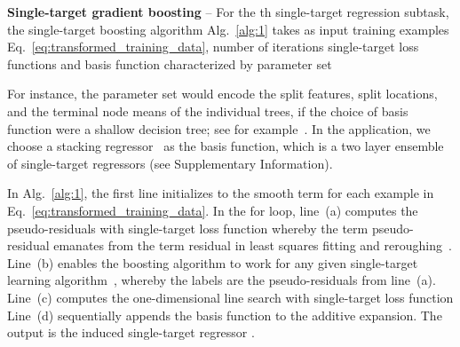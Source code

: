 \documentclass[aps,twocolumn,superscriptaddress,floatfix,preprintnumbers,showkeys]{revtex4}
\begin{document}
\textbf{Single-target gradient boosting} -- For the th single-target regression subtask, the single-target boosting algorithm Alg.~\ref{alg:1} takes as input training examples Eq.~\ref{eq:transformed_training_data}, number of iterations  single-target loss functions  and basis function  characterized by parameter set  
\begin{figure*}
\begin{minipage}{\linewidth}
\begin{algorithm}[H]
\SetAlgoLined
{}
\caption{}
\label{alg:1}
\end{algorithm}
\end{minipage}
\end{figure*}
For instance, the parameter set would encode the split features, split locations, and the terminal node means of the individual trees, if the choice of basis function were a shallow decision tree; see for example~\cite{Friedman_2001, Friedman_2003, Hastie_2009, Chen_2016, Ke_2017}. In the application, we choose a stacking regressor~\cite{Wolpert_1992, Breiman_1996, Sklearn_2011} as the basis function, which is a two layer ensemble of single-target regressors (see Supplementary Information). 

In Alg.~\ref{alg:1}, the first line initializes to the smooth term for each example in Eq.~\ref{eq:transformed_training_data}. In the for loop, line~(a) computes the pseudo-residuals with single-target loss function  whereby the term pseudo-residual emanates from the term residual in least squares fitting and reroughing~\cite{Tukey_1977, Friedman_2001, Friedman_2003, Hastie_2009}. Line~(b) enables the boosting algorithm to work for any given single-target learning algorithm~\cite{Friedman_2001, Friedman_2003, Hastie_2009}, whereby the labels are the pseudo-residuals from line~(a). Line~(c) computes the one-dimensional line search with single-target loss function  Line~(d) sequentially appends the basis function to the additive expansion. The output is the induced single-target regressor .
\end{document}
